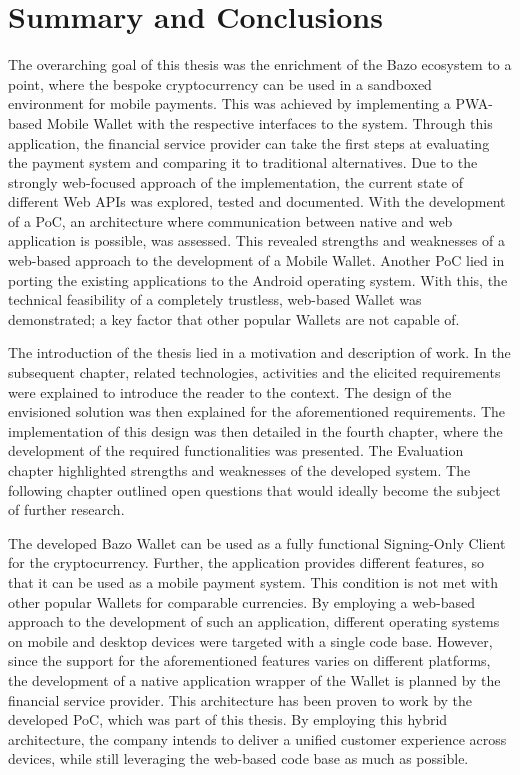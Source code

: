 \chapter{Summary and Conclusions}

The overarching goal of this thesis was the enrichment of the Bazo ecosystem to a point, where the bespoke cryptocurrency can be used in a sandboxed environment for mobile payments. This was achieved by implementing a PWA-based Mobile Wallet with the respective interfaces to the system. Through this application, the financial service provider can take the first steps at evaluating the payment system and comparing it to traditional alternatives. Due to the strongly web-focused approach of the implementation, the current state of different Web APIs was explored, tested and documented. With the development of a PoC, an architecture where communication between native and web application is possible, was assessed. This revealed strengths and weaknesses of a web-based approach to the development of a Mobile Wallet. Another PoC lied in porting the existing applications to the Android operating system. With this, the technical feasibility of a completely trustless, web-based Wallet was demonstrated; a key factor that other popular Wallets are not capable of.

The introduction of the thesis lied in a motivation and description of work. In the subsequent chapter, related technologies, activities and the elicited requirements were explained to introduce the reader to the context. The design of the envisioned solution was then explained for the aforementioned requirements. The implementation of this design was then detailed in the fourth chapter, where the development of the required functionalities was presented. The Evaluation chapter highlighted strengths and weaknesses of the developed system. The following chapter outlined open questions that would ideally become the subject of further research.

The developed Bazo Wallet can be used as a fully functional Signing-Only Client for the cryptocurrency. Further, the application provides different features, so that it can be used as a mobile payment system. This condition is not met with other popular Wallets for comparable currencies. By employing a web-based approach to the development of such an application, different operating systems on mobile and desktop devices were targeted with a single code base. However, since the support for the aforementioned features varies on different platforms, the development of a native application wrapper of the Wallet is planned by the financial service provider. This architecture has been proven to work by the developed PoC, which was part of this thesis. By employing this hybrid architecture, the company intends to deliver a unified customer experience across devices, while still leveraging the web-based code base as much as possible.